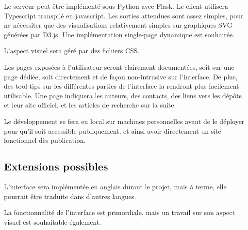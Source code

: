 Le serveur peut être implémenté sous Python avec Flask.
Le client utilisera Typescript transpilé en javascript.
Les sorties attendues sont assez simples,
pour ne nécessiter que des visualisations relativement simples
sur graphiques SVG générées par D3.js.
Une implémentation single-page dynamique est souhaitée.

L'aspect visuel sera géré par des fichiers CSS.

Les pages exposées à l'utilisateur seront clairement documentées,
soit sur une page dédiée,
soit directement et de façon non-intrusive sur l'interface.
De plus, des tool-tips sur les différentes parties de l'interface
la rendront plus facilement utilisable.
Une page indiquera les auteurs, des contacts,
des liens vers les dépôts et leur site officiel,
et les articles de recherche sur la suite.

Le développement se fera en local sur machines personnelles
avant de le déployer pour qu'il soit accessible publiquement,
et ainsi avoir directement un site fonctionnel dès publication.


\subsection{Extensions possibles}

L'interface sera implémentée en anglais durant le projet,
mais à terme, elle pourrait être traduite dans d'autres langues.

La fonctionnalité de l'interface est primordiale,
mais un travail sur son aspect visuel est souhaitable également.
